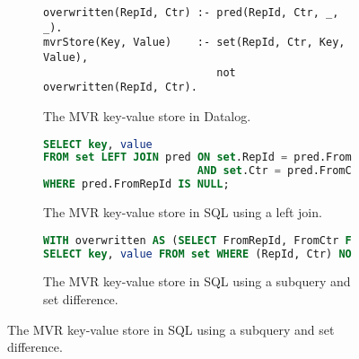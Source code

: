 \begin{figure}[htpb]
	\centering

	\begin{subfigure}[b]{\textwidth}
		\begin{lstlisting}[keepspaces]
overwritten(RepId, Ctr) :- pred(RepId, Ctr, _, _).
mvrStore(Key, Value)    :- set(RepId, Ctr, Key, Value),
                           not overwritten(RepId, Ctr).\end{lstlisting}
		\caption{The \ac{MVR} key-value store in Datalog.}\label{code:mvr-store-datalog}
	\end{subfigure}

	\vspace{1em}

	\begin{subfigure}[b]{\textwidth}
		\begin{lstlisting}[language=SQL]
SELECT key, value
FROM set LEFT JOIN pred ON set.RepId = pred.FromRepId
                        AND set.Ctr = pred.FromCtr
WHERE pred.FromRepId IS NULL;
        \end{lstlisting}
		\caption{The \ac{MVR} key-value store in SQL using a left join.}\label{code:mvr-store-sql-left-join}
	\end{subfigure}

	\vspace{1em}

	\begin{subfigure}[b]{\textwidth}
		\begin{lstlisting}[language=SQL]
WITH overwritten AS (SELECT FromRepId, FromCtr FROM pred)
SELECT key, value FROM set WHERE (RepId, Ctr) NOT IN overwritten;
        \end{lstlisting}
		\caption{The \ac{MVR} key-value store in SQL using a subquery and set difference.}\label{code:mvr-store-sql-subquery}
	\end{subfigure}
\end{figure}

